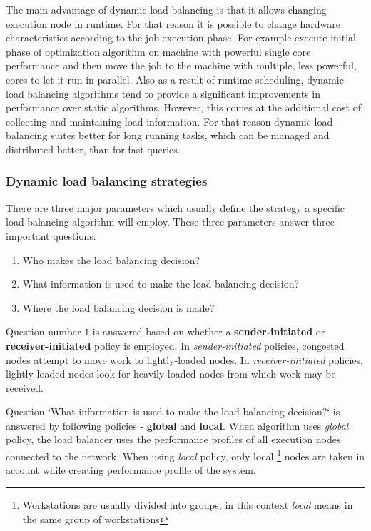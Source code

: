 The main advantage of dynamic load balancing is that it allows changing execution node in runtime.
For that reason it is possible to change hardware characteristics according to the job execution phase.
For example execute initial phase of optimization algorithm on machine with powerful single core performance
and then move the job to the machine with multiple, less powerful, cores to let it run in parallel.
Also as a result of runtime scheduling,
dynamic load balancing algorithms tend to provide a significant improvements in performance over static algorithms.
However, this comes at the additional cost of collecting and maintaining load information\cite{malik2000dynamic}.
For that reason dynamic load balancing suites better for long running tasks, which can be managed and distributed better, than for fast queries.

\subsubsection{Dynamic load balancing strategies}
There are three major parameters which usually define the strategy a specific load balancing algorithm will employ.
These three parameters answer three important questions\cite{malik2000dynamic}:
\begin{enumerate}
    \item Who makes the load balancing decision?
    \item What information is used to make the load balancing decision?
    \item Where the load balancing decision is made?
\end{enumerate}

Question number $1$ is answered based on whether a \textbf{sender-initiated} or \textbf{receiver-initiated} policy is employed.
In \textit{sender-initiated} policies, congested nodes attempt to move work to lightly-loaded nodes.
In \textit{receiver-initiated} policies, lightly-loaded nodes look for heavily-loaded nodes from which work may be received\cite{malik2000dynamic}.

\smallskip
Question `What information is used to make the load balancing decision?` is answered by following policies - \textbf{global} and \textbf{local}.
When algorithm uses \textit{global} policy, the load balancer uses the performance profiles of all execution nodes connected to the network.
When using \textit{local} policy, only local
\footnote{Workstations are usually divided into groups, in this context \textit{local} means in the same group of workstations}
nodes are taken in account while creating performance profile of the system.


